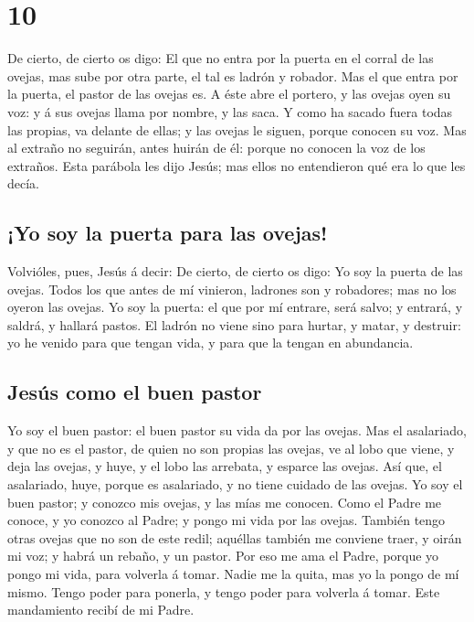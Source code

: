 \hypertarget{section-9}{%
\section{10}\label{section-9}}

 De cierto, de cierto os digo: El que no entra por la
puerta en el corral de las ovejas, mas sube por otra parte, el tal es
ladrón y robador.  Mas el que entra por la puerta, el
pastor de las ovejas es.  A éste abre el portero, y las
ovejas oyen su voz: y á sus ovejas llama por nombre, y las saca.
 Y como ha sacado fuera todas las propias, va delante de
ellas; y las ovejas le siguen, porque conocen su voz.  Mas
al extraño no seguirán, antes huirán de él: porque no conocen la voz de
los extraños.  Esta parábola les dijo Jesús; mas ellos no
entendieron qué era lo que les decía.

\hypertarget{yo-soy-la-puerta-para-las-ovejas}{%
\subsection{¡Yo soy la puerta para las
ovejas!}\label{yo-soy-la-puerta-para-las-ovejas}}

 Volvióles, pues, Jesús á decir: De cierto, de cierto os
digo: Yo soy la puerta de las ovejas.  Todos los que antes
de mí vinieron, ladrones son y robadores; mas no los oyeron las ovejas.
 Yo soy la puerta: el que por mí entrare, será salvo; y
entrará, y saldrá, y hallará pastos.  El ladrón no viene
sino para hurtar, y matar, y destruir: yo he venido para que tengan
vida, y para que la tengan en abundancia.

\hypertarget{jesuxfas-como-el-buen-pastor}{%
\subsection{Jesús como el buen
pastor}\label{jesuxfas-como-el-buen-pastor}}

 Yo soy el buen pastor: el buen pastor su vida da por las
ovejas.  Mas el asalariado, y que no es el pastor, de
quien no son propias las ovejas, ve al lobo que viene, y deja las
ovejas, y huye, y el lobo las arrebata, y esparce las ovejas.
 Así que, el asalariado, huye, porque es asalariado, y no
tiene cuidado de las ovejas.  Yo soy el buen pastor; y
conozco mis ovejas, y las mías me conocen.  Como el Padre
me conoce, y yo conozco al Padre; y pongo mi vida por las ovejas.
 También tengo otras ovejas que no son de este redil;
aquéllas también me conviene traer, y oirán mi voz; y habrá un rebaño, y
un pastor.  Por eso me ama el Padre, porque yo pongo mi
vida, para volverla á tomar.  Nadie me la quita, mas yo
la pongo de mí mismo. Tengo poder para ponerla, y tengo poder para
volverla á tomar. Este mandamiento recibí de mi Padre.


